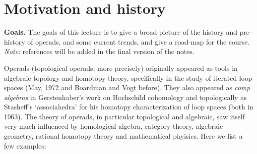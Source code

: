 

\section{Motivation and history}\label{lecture:theintro}
 
\textbf{Goals.} The goals of this lecture is to
give a broad picture of the history and 
pre-history of operads, and some current trends,
and give a road-map for the course.  
 \emph{Note:} references will be
 added in the final version of the notes.
  
Operads (topological operads, more precisely)
originally appeared as tools in algebraic
topology and homotopy theory, 
specifically in the study of iterated loop 
spaces (May, 1972 and Boardman and Vogt before).
They also appeared as \emph{comp algebras} in Gerstenhaber's 
work on Hochschild cohomology and topologically as 
Stasheff's `associahedra' for his homotopy
characterization of loop spaces (both in 1963).
The theory of operads, in particular topological
and algebraic, saw itself very much influenced by
homological algebra, category theory, algebraic
geometry, rational homotopy theory and mathematical
phyisics. Here we list a few examples:

